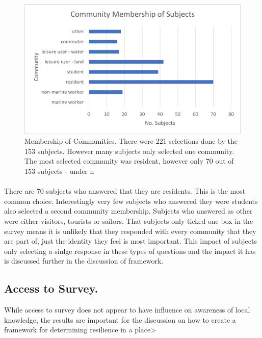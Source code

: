 \begin{figure}[h!]
    \centering
    \includegraphics{fig_results/com-mem-horizontal.png}
    \caption{Membership of Communities. There were 221 selections done by the 153 subjects. However many subjects only selected one community. The most selected community was resident, however only 70 out of 153 subjects - under h}
    \label{fig:my_label}
\end{figure}
\paragraph{}

There are 70 subjects who answered that they are residents. This is the most common choice. Interestingly very few subjects who answered they were students also selected a second community membership. Subjects who answered as other were either visitors, tourists or sailors. That subjects only ticked one box in the survey means it is unlikely that they responded with every community that they are part of, just the identity they feel is most important. This impact of subjects only selecting a sinlge response in these types of questions and the impact it has is discussed further in the discussion of framework. 


\subsection{Access to Survey. }
While access to survey does not appear to have influence on awareness of local knowledge, the results are important for the discussion on how to create a framework for determining resilience in a place>

